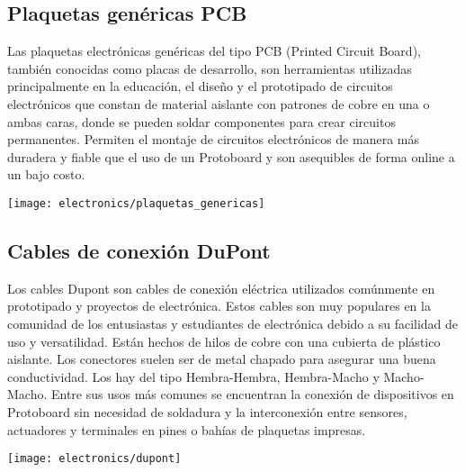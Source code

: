 \subsection{Plaquetas genéricas PCB}
Las plaquetas electrónicas genéricas del tipo PCB (Printed Circuit Board), también conocidas como placas de desarrollo, son herramientas utilizadas principalmente en la educación, el diseño y el prototipado de circuitos electrónicos que constan de material aislante con patrones de cobre en una o ambas caras, donde se pueden soldar componentes para crear circuitos permanentes. Permiten el montaje de circuitos electrónicos de manera más duradera y fiable que el uso de un Protoboard y son asequibles de forma online a un bajo costo.

\begin{center}
  \centering
  \texttt{[image: electronics/plaquetas\_genericas]}
  \label{fig:plaquetas_genericas}
\end{center}


\subsection{Cables de conexión DuPont}
Los cables Dupont son cables de conexión eléctrica utilizados comúnmente en prototipado y proyectos de electrónica. Estos cables son muy populares en la comunidad de los entusiastas y estudiantes de electrónica debido a su facilidad de uso y versatilidad. Están hechos de hilos de cobre con una cubierta de plástico aislante. Los conectores suelen ser de metal chapado para asegurar una buena conductividad. Los hay del tipo Hembra-Hembra, Hembra-Macho y Macho-Macho. Entre sus usos más comunes se encuentran la conexión de dispositivos en Protoboard sin necesidad de soldadura y la interconexión entre sensores, actuadores y terminales en pines o bahías de plaquetas impresas.

\begin{center}
  \centering
  \texttt{[image: electronics/dupont]}
  \label{fig:dupont}
\end{center}

